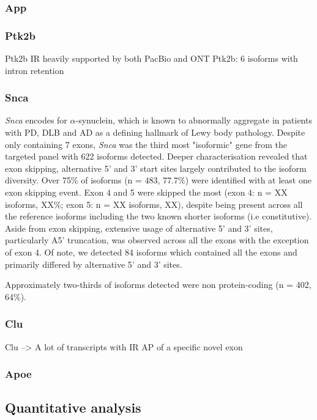 \subsubsection{App}

\subsubsection{Ptk2b}
Ptk2b IR heavily supported by both PacBio and ONT 
Ptk2b: 6 isoforms with intron retention

\subsubsection{Snca}
\textit{Snca} encodes for $\alpha$-synuclein, which is known to abnormally aggregate in patients with PD, DLB and AD as a defining hallmark of Lewy body pathology. Despite only containing 7 exons, \textit{Snca} was the third most "isoformic" gene from the targeted panel with 622 isoforms detected. Deeper characterisation revealed that exon skipping, alternative 5' and 3' start sites largely contributed to the isoform diversity. Over 75\% of isoforms (n  = 483, 77.7\%) were identified with at least one exon skipping event. Exon 4 and 5 were skipped the most (exon 4: n = XX isoforms, XX\%; exon 5: n = XX isoforms, XX), despite being present across all the reference isoforms including the two known shorter isoforms (i.e constitutive). Aside from exon skipping, extensive usage of alternative 5' and 3' sites, particularly A5' truncation, was observed across all the exons with the exception of exon 4. Of note, we detected 84 isoforms which contained all the exons and primarily differed by alternative 5' and 3' sites. 

Approximately two-thirds of isoforms detected were non protein-coding (n = 402, 64\%). 

\subsubsection{Clu}
Clu --> A lot of transcripts with IR AP of a specific novel exon

\subsubsection{Apoe}


\newpage
\subsection{Quantitative analysis}
